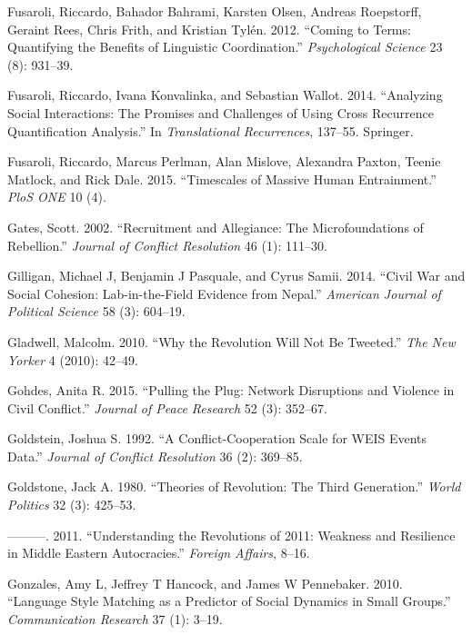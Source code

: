 \documentclass[
  english,
  man]{apa6}
\begin{document}
\leavevmode\hypertarget{ref-fusaroli2012coming}{}%
Fusaroli, Riccardo, Bahador Bahrami, Karsten Olsen, Andreas Roepstorff, Geraint Rees, Chris Frith, and Kristian Tylén. 2012. ``Coming to Terms: Quantifying the Benefits of Linguistic Coordination.'' \emph{Psychological Science} 23 (8): 931--39.

\leavevmode\hypertarget{ref-fusaroli2014analyzing}{}%
Fusaroli, Riccardo, Ivana Konvalinka, and Sebastian Wallot. 2014. ``Analyzing Social Interactions: The Promises and Challenges of Using Cross Recurrence Quantification Analysis.'' In \emph{Translational Recurrences}, 137--55. Springer.

\leavevmode\hypertarget{ref-fusaroli2015timescales}{}%
Fusaroli, Riccardo, Marcus Perlman, Alan Mislove, Alexandra Paxton, Teenie Matlock, and Rick Dale. 2015. ``Timescales of Massive Human Entrainment.'' \emph{PloS ONE} 10 (4).

\leavevmode\hypertarget{ref-gates2002recruitment}{}%
Gates, Scott. 2002. ``Recruitment and Allegiance: The Microfoundations of Rebellion.'' \emph{Journal of Conflict Resolution} 46 (1): 111--30.

\leavevmode\hypertarget{ref-gilligan2014civil}{}%
Gilligan, Michael J, Benjamin J Pasquale, and Cyrus Samii. 2014. ``Civil War and Social Cohesion: Lab-in-the-Field Evidence from Nepal.'' \emph{American Journal of Political Science} 58 (3): 604--19.

\leavevmode\hypertarget{ref-gladwell2010revolution}{}%
Gladwell, Malcolm. 2010. ``Why the Revolution Will Not Be Tweeted.'' \emph{The New Yorker} 4 (2010): 42--49.

\leavevmode\hypertarget{ref-gohdes2015pulling}{}%
Gohdes, Anita R. 2015. ``Pulling the Plug: Network Disruptions and Violence in Civil Conflict.'' \emph{Journal of Peace Research} 52 (3): 352--67.

\leavevmode\hypertarget{ref-goldstein1992conflict}{}%
Goldstein, Joshua S. 1992. ``A Conflict-Cooperation Scale for WEIS Events Data.'' \emph{Journal of Conflict Resolution} 36 (2): 369--85.

\leavevmode\hypertarget{ref-goldstone1980theories}{}%
Goldstone, Jack A. 1980. ``Theories of Revolution: The Third Generation.'' \emph{World Politics} 32 (3): 425--53.

\leavevmode\hypertarget{ref-goldstone2011understanding}{}%
---------. 2011. ``Understanding the Revolutions of 2011: Weakness and Resilience in Middle Eastern Autocracies.'' \emph{Foreign Affairs}, 8--16.

\leavevmode\hypertarget{ref-gonzales2010language}{}%
Gonzales, Amy L, Jeffrey T Hancock, and James W Pennebaker. 2010. ``Language Style Matching as a Predictor of Social Dynamics in Small Groups.'' \emph{Communication Research} 37 (1): 3--19.
\end{document}
